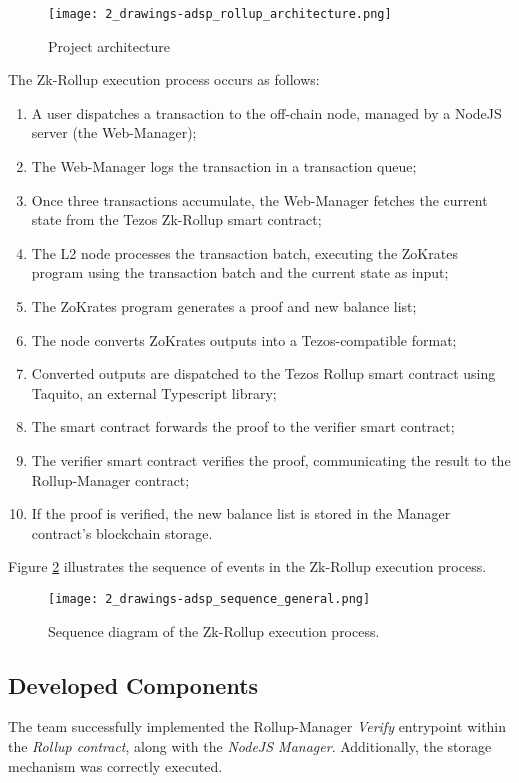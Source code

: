 \begin{figure}[ht]
  \centering
  \texttt{[image: 2\_drawings-adsp\_rollup\_architecture.png]}
  \caption[Project Architecture]{Project architecture}  
  \label{fig:2_general_rollup_architecture}
\end{figure}

The Zk-Rollup execution process occurs as follows:
\begin{enumerate}
    \item A user dispatches a transaction to the off-chain node, managed by a NodeJS server (the Web-Manager);
    \item The Web-Manager logs the transaction in a transaction queue;
    \item Once three transactions accumulate, the Web-Manager fetches the current state from the Tezos Zk-Rollup smart contract;
    \item The L2 node processes the transaction batch, executing the ZoKrates program using the transaction batch and the current state as input;
    \item The ZoKrates program generates a proof and new balance list;
    \item The node converts ZoKrates outputs into a Tezos-compatible format;
    \item Converted outputs are dispatched to the Tezos Rollup smart contract using Taquito, an external Typescript library;
    \item The smart contract forwards the proof to the verifier smart contract;
    \item The verifier smart contract verifies the proof, communicating the result to the Rollup-Manager contract;
    \item If the proof is verified, the new balance list is stored in the Manager contract's blockchain storage.
\end{enumerate}

Figure \ref{fig:2_drawings-adsp_sequence_general.png} illustrates the sequence of events in the Zk-Rollup execution process.

\begin{figure}[ht]
  \centering
  \texttt{[image: 2\_drawings-adsp\_sequence\_general.png]}
  \caption[Sequence Zk-Rollup]{Sequence diagram of the Zk-Rollup execution process.}  
  \label{fig:2_drawings-adsp_sequence_general.png}
\end{figure} 

\subsection{Developed Components}
The team successfully implemented the Rollup-Manager \textit{Verify} entrypoint within the \textit{Rollup contract}, along with the \textit{NodeJS Manager}. Additionally, the storage mechanism was correctly executed.

